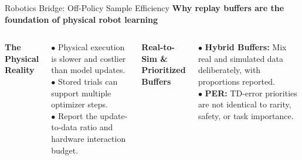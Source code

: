 \documentclass[aspectratio=169,10pt]{beamer}
\newcommand{\sectionlabel}[1]{%
  {\small\bfseries\color{islteal}#1}\par\vspace{0.14cm}%
}
\begin{document}
\begin{frame}{Robotics Bridge: Off-Policy Sample Efficiency}
  \sectionlabel{Why replay buffers are the foundation of physical robot learning}

  \begin{columns}[T,onlytextwidth]
      {\small\bfseries\color{islnavy} The Physical Reality}\par\vspace{0.08cm}
      {\footnotesize
      $\bullet$ Physical execution is slower and costlier than model updates.\\[2pt]
      $\bullet$ Stored trials can support multiple optimizer steps.\\[2pt]
      $\bullet$ Report the update-to-data ratio and hardware interaction budget.}

      {\small\bfseries\color{islteal} Real-to-Sim \& Prioritized Buffers}\par\vspace{0.08cm}
      {\footnotesize
      $\bullet$ \textbf{Hybrid Buffers:} Mix real and simulated data deliberately, with proportions reported.\\[2pt]
      $\bullet$ \textbf{PER:} TD-error priorities are not identical to rarity, safety, or task importance.}
  \end{columns}
\end{frame}
\end{document}

